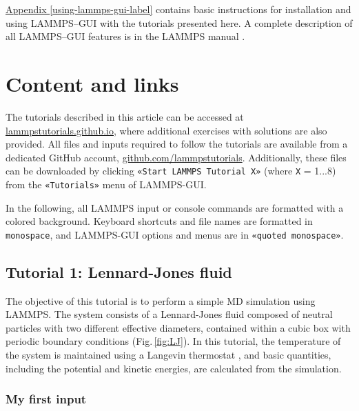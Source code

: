 \documentclass[9pt,tutorial]{livecoms}
\newcommand{\lmpcmd}[1]{\hspace{0pt}\colorbox{listing}{\textcolor{command}{\small{#1}}}\hspace{0pt}} %
\newcommand{\flecmd}[1]{\textcolor{command}{\texttt{#1}}} %
\newcommand{\guicmd}[1]{\textcolor{command}{\texttt{«#1»}}} %
\begin{document}
\hyperref[using-lammps-gui-label]{Appendix \ref{using-lammps-gui-label}}
contains basic instructions for installation and using LAMMPS--GUI with
the tutorials presented here.  A complete description of all LAMMPS--GUI
features is in the LAMMPS manual \cite{lammps_gui_docs}.

\section{Content and links}

The tutorials described in this article can be accessed at
\href{https://lammpstutorials.github.io}{lammpstutorials.github.io},
where additional exercises with solutions are also provided.  All files
and inputs required to follow the tutorials are available from a
dedicated GitHub account,
\href{https://github.com/lammpstutorials}{github.com/lammpstutorials}.
Additionally, these files can be downloaded by clicking \guicmd{Start LAMMPS Tutorial X}
(where \texttt{X} = 1...8) from the \guicmd{Tutorials} menu of LAMMPS-GUI.

In the following, all LAMMPS input or console commands are formatted
with a \lmpcmd{colored background}.  Keyboard shortcuts and 
file names are formatted in \flecmd{monospace}, and LAMMPS-GUI options and menus
are in \guicmd{quoted monospace}.

\subsection{Tutorial 1: Lennard-Jones fluid}
\label{lennard-jones-label}

The objective of this tutorial is to perform a simple MD simulation
using LAMMPS.  The system consists of a Lennard-Jones fluid composed of neutral
particles with two different effective diameters, contained within a
cubic box with periodic boundary conditions (Fig.\,\ref{fig:LJ}).  In
this tutorial, the temperature of the system is maintained using a
Langevin thermostat \cite{schneider1978molecular}, and basic quantities,
including the potential and kinetic energies, are calculated from the
simulation.

\subsubsection{My first input}
\end{document}
